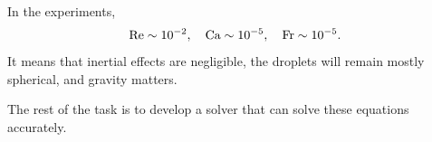 \begin{frame}
\begin{columns}[T]
\begin{column}{0.4\textwidth}
      \pause
      \begin{flushleft}
        In the experiments, %
        \begin{equation} \notag
          \begin{aligned}
            \textrm{Re} \sim 10^{-2}, \quad
            \textrm{Ca} \sim 10^{-5}, \quad
            \textrm{Fr} \sim 10^{-5}.  
          \end{aligned}
        \end{equation}
        It means that inertial effects are negligible,
        the droplets will remain mostly spherical,
        and gravity matters.
        \vskip0.4cm

        \pause
        The rest of the task is to develop a solver that can solve these equations accurately.
      \end{flushleft}
    \end{column}
    
  \end{columns}
  
\end{frame}

